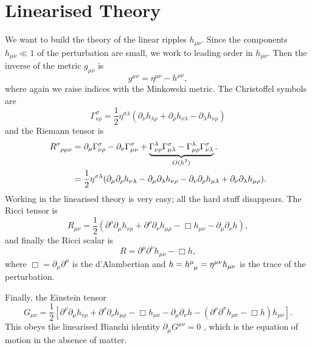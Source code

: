 
\section{Linearised Theory}%
\label{sec:linearised_theory}

We want to build the theory of the linear ripples $h_{\mu\nu}$.
Since the components $h_{\mu\nu} \ll 1$ of the perturbation are small, we work to leading order in $h_{\mu\nu}$. Then the inverse of the metric $g_{\mu\nu}$ is
\begin{equation}
  g^{\mu\nu} = \eta^{\mu\nu} - h^{\mu\nu},
\end{equation}
where again we raise indices with the Minkowski metric.
The Christoffel symbols are
\begin{equation}
  \Gamma^{\sigma}_{\nu\rho} = \frac{1}{2} \eta^{\sigma\lambda}(\partial_{\nu} h_{\lambda\rho} + \partial_{\rho} h_{\nu\lambda} - \partial_{\lambda} h_{\nu\rho})
\end{equation}
and the Riemann tensor is
\begin{align}
  R\indices{^{\sigma}_{\rho\mu\nu}} &= \partial_{\mu} \Gamma^{\sigma}_{\nu\rho} - \partial_{\nu} \Gamma^{\sigma}_{\mu\nu} + \underbrace{\Gamma^{\lambda}_{\nu\rho} \Gamma^{\sigma}_{\mu\lambda} - \Gamma^{\lambda}_{\mu\rho} \Gamma^{\sigma}_{\nu\lambda}}_{\mathclap{O(h^2)}}. \\
				    &= \frac{1}{2} \eta^{\sigma\lambda} (\partial_{\mu} \partial_{\rho} h_{\nu\lambda} - \partial_{\mu} \partial_{\lambda} h_{\nu\rho} - \partial_{\nu} \partial_{\rho} h_{\mu\lambda} + \partial_{\nu} \partial_{\lambda} h_{\mu\rho}).
\end{align}
Working in the linearised theory is very easy; all the hard stuff disappears.
The Ricci tensor is
\begin{equation}
  \label{eq:20-riem}
  R_{\mu\nu} = \frac{1}{2} (\partial^{\rho} \partial_{\mu} h_{\nu\rho} + \partial^{\rho} \partial_{\nu} h_{\mu\rho} - \Box h_{\mu\nu} - \partial_{\mu} \partial_{\nu} h),
\end{equation}
and finally the Ricci scalar is
\begin{equation}
  R = \partial^{\mu} \partial^{\nu} h_{\mu\nu} - \Box h,
\end{equation}
where $\Box = \partial_{\mu} \partial^{\mu}$ is the d'Alambertian and $h = h\indices{^{\mu}_{\mu}} = \eta^{\mu\nu} h_{\mu\nu}$ is the trace of the perturbation.

Finally, the Einstein tensor
\begin{equation}
  G_{\mu\nu} = \frac{1}{2} \left[ \partial^{\rho} \partial_{\mu} h_{\nu\rho} + \partial^{\rho} \partial_{\nu} h_{\mu\rho} - \Box h_{\mu\nu} - \partial_{\mu} \partial_{\nu} h - (\partial^{\rho} \partial^{\sigma} h_{\rho\sigma} - \Box h) h_{\mu\nu} \right].
\end{equation}
This obeys the linearised Bianchi identity $\partial_{\mu} G^{\mu\nu} = 0$ , which is the equation of motion in the absence of matter.


